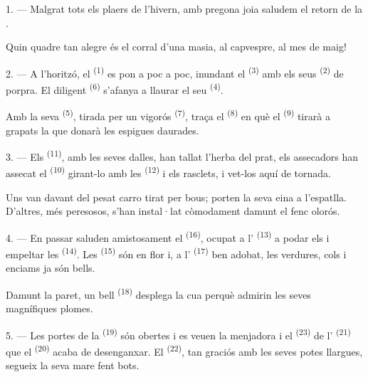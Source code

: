 \VUsaut{3.0mm}
\VUsaut{3.0mm}

\VUsaut{4.0mm}

1. --- Malgrat tots els plaers de l'hivern, amb pregona joia saludem el retorn de
la .

Quin quadre tan alegre és el corral d'una masia, al capvespre, al mes de maig!

2. --- A l'horitzó, el  \textsuperscript{(1)} es pon a poc a poc,
inundant el  \textsuperscript{(3)} amb els seus 
\textsuperscript{(2)} de porpra. El diligent 
\textsuperscript{(6)} s'afanya a llaurar el seu 
\textsuperscript{(4)}.

Amb la seva  \textsuperscript{(5)}, tirada per un vigorós
 \textsuperscript{(7)}, traça el 
\textsuperscript{(8)} en què el  \textsuperscript{(9)} tirarà a
grapats la  que donarà les espigues daurades.

3. --- Els  \textsuperscript{(11)}, amb les seves dalles, han
tallat l'herba del prat, els assecadors han assecat el 
\textsuperscript{(10)} girant-lo amb les  \textsuperscript{(12)} i
els rasclets, i vet-los aquí de tornada.

Uns van davant del pesat carro tirat per bous; porten la seva eina a l'espatlla.
D'altres, més peresosos, s'han instal·lat còmodament damunt el fenc olorós.

4. --- En passar saluden amistosament el  \textsuperscript{(16)},
ocupat a l' \textsuperscript{(13)} a podar els
 i empeltar les  \textsuperscript{(14)}.
Les  \textsuperscript{(15)} són en flor i, a l'
\textsuperscript{(17)} ben adobat, les verdures, cols i enciams ja són bells.

Damunt la paret, un bell  \textsuperscript{(18)} desplega la cua
perquè admirin les seves magnífiques plomes.

\VUsaut{3.0mm}

5. --- Les portes de la  \textsuperscript{(19)} són obertes i es
veuen la menjadora i el  \textsuperscript{(23)} de l'
\textsuperscript{(21)} que el  \textsuperscript{(20)} acaba
de desenganxar. El  \textsuperscript{(22)}, tan graciós amb les
seves potes llargues, segueix la seva mare fent bots.

